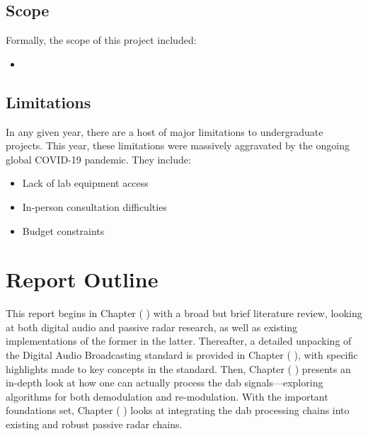 \documentclass[class=report,11pt,crop=false]{standalone}
\begin{document}
\subsection{Scope}
Formally, the scope of this project included:
\begin{itemize}
    \item 
\end{itemize}

\subsection{Limitations}
In any given year, there are a host of major limitations to undergraduate projects. This year, these limitations were massively aggravated by the ongoing global COVID-19 pandemic. They include:
\begin{itemize}
    \item Lack of lab equipment access
    \item In-person consultation difficulties
    \item Budget constraints
\end{itemize}


\section{Report Outline}
This report begins in Chapter ( ) with a broad but brief literature review, looking at both digital audio and passive radar research, as well as existing implementations of the former in the latter. Thereafter, a detailed unpacking of the Digital Audio Broadcasting standard is provided in Chapter ( ), with specific highlights made to key concepts in the standard. Then, Chapter ( ) presents an in-depth look at how one can actually process the \acrshort{dab} signals---exploring algorithms for both demodulation and re-modulation. With the important foundations set, Chapter ( ) looks at integrating the \acrshort{dab} processing chains into existing and robust passive radar chains.




\ifstandalone

\printnoidxglossary[type=\acronymtype,nonumberlist]
\fi
\end{document}
